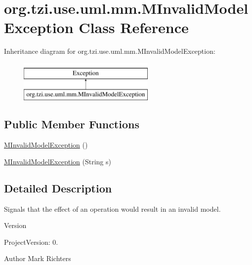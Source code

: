 \hypertarget{classorg_1_1tzi_1_1use_1_1uml_1_1mm_1_1_m_invalid_model_exception}{\section{org.\-tzi.\-use.\-uml.\-mm.\-M\-Invalid\-Model\-Exception Class Reference}
\label{classorg_1_1tzi_1_1use_1_1uml_1_1mm_1_1_m_invalid_model_exception}
}
Inheritance diagram for org.\-tzi.\-use.\-uml.\-mm.\-M\-Invalid\-Model\-Exception\-:\begin{figure}[H]
\begin{center}
\leavevmode
\includegraphics[height=2.000000cm]{classorg_1_1tzi_1_1use_1_1uml_1_1mm_1_1_m_invalid_model_exception}
\end{center}
\end{figure}
\subsection*{Public Member Functions}
\begin{DoxyCompactItemize}
\item 
\hyperlink{classorg_1_1tzi_1_1use_1_1uml_1_1mm_1_1_m_invalid_model_exception_a292d3ef554e67148da472103e5855b78}{M\-Invalid\-Model\-Exception} ()
\item 
\hyperlink{classorg_1_1tzi_1_1use_1_1uml_1_1mm_1_1_m_invalid_model_exception_a2eb53e24a44feb60b3388cf76f340e8d}{M\-Invalid\-Model\-Exception} (String s)
\end{DoxyCompactItemize}


\subsection{Detailed Description}
Signals that the effect of an operation would result in an invalid model.

\begin{DoxyVersion}{Version}

\end{DoxyVersion}
\begin{DoxyParagraph}{Project\-Version\-:}
0. 
\end{DoxyParagraph}
\begin{DoxyAuthor}{Author}
Mark Richters 
\end{DoxyAuthor}


